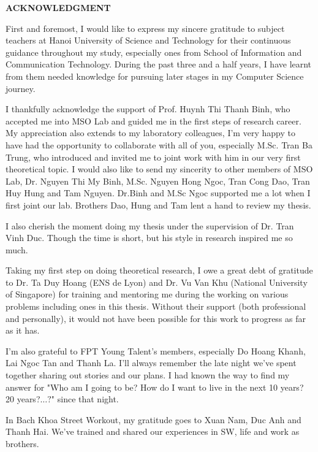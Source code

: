 % 
\begin{center}
    \Large{\textbf{ACKNOWLEDGMENT}}\\
\end{center}
\vspace{1cm}

First and foremost, I would like to express my sincere gratitude to subject teachers at Hanoi University of Science and Technology for their continuous guidance throughout my study, especially ones from School of Information and Communication Technology. During the past three and a half years, I have learnt from them needed knowledge for pursuing later stages in my Computer Science journey.

I thankfully acknowledge the support of Prof. Huynh Thi Thanh Binh, who accepted me into MSO Lab and guided me in the first steps of research career. My appreciation also extends to my laboratory colleagues, I'm very happy to have had the opportunity to collaborate with all of you, especially M.Sc. Tran Ba Trung, who introduced and invited me to joint work with him in our very first theoretical topic. I would also like to send my sincerity to other members of MSO Lab, Dr. Nguyen Thi My Binh, M.Sc. Nguyen Hong Ngoc, Tran Cong Dao, Tran Huy Hung and {\color{red} Tam Nguyen}. Dr.Binh and M.Sc Ngoc supported me a lot when I first joint our lab. Brothers Dao, Hung and Tam lent a hand to review my thesis. 

I also cherish the moment doing my thesis under the supervision of Dr. Tran Vinh Duc. Though the time is short, but his style in research inspired me so much. 

Taking my first step on doing theoretical research, I owe a great debt of gratitude to Dr. Ta Duy Hoang (ENS de Lyon) and Dr. Vu Van Khu (National University of Singapore) for training and mentoring me during the working on various problems including ones in this thesis. Without their support (both professional and personally), it would not have been possible for this work to progress as far as it has. 

I'm also grateful to FPT Young Talent's members, especially Do Hoang Khanh, Lai Ngoc Tan and Thanh La. I'll always remember the late night we've spent together sharing out stories and our plans. I had known the way to find my answer for "Who am I going to be? How do I want to live in the next 10 years? 20 years?$\ldots?$" since that night.

In Bach Khoa Street Workout, my gratitude goes to Xuan Nam, Duc Anh and Thanh Hai. We've trained and shared our experiences in SW, life and  work as brothers. 

